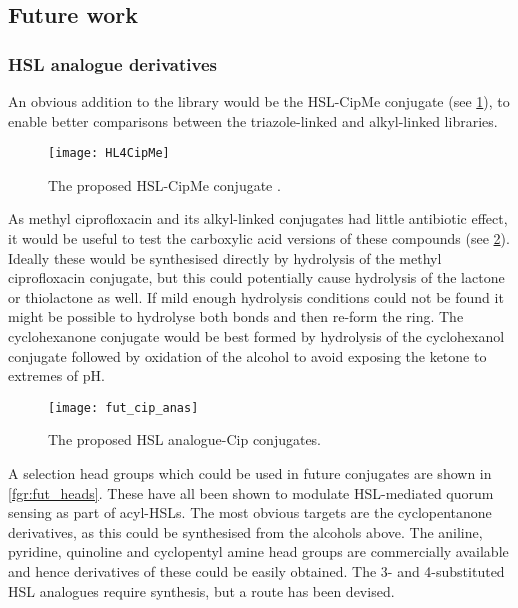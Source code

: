 \subsection{Future work \label{sec:Fut2}}

\subsubsection{HSL analogue derivatives}

An obvious addition to the library would be the HSL-CipMe conjugate (see \ref{fgr:HL4CipMe}), to enable better comparisons between the triazole-linked and alkyl-linked libraries.

\begin{figure}[H]
	\begin{center}
		\texttt{[image: HL4CipMe]}
		\caption{The proposed HSL-CipMe conjugate .
		\label{fgr:HL4CipMe}}
	\end{center}
\end{figure}

As methyl ciprofloxacin and its alkyl-linked conjugates had little antibiotic effect, it would be useful to test the carboxylic acid versions of these compounds (see \ref{fgr:fut_cip_anas}). Ideally these would be synthesised directly by hydrolysis of the methyl ciprofloxacin conjugate, but this could potentially cause hydrolysis of the lactone or thiolactone as well. If mild enough hydrolysis conditions could not be found it might be possible to hydrolyse both bonds and then re-form the ring\cite{Witiak1978}. The cyclohexanone conjugate would be best formed by hydrolysis of the cyclohexanol conjugate followed by oxidation of the alcohol to avoid exposing the ketone to extremes of pH.

\begin{figure}[H]
	\begin{center}
		\texttt{[image: fut\_cip\_anas]}
		\caption{The proposed HSL analogue-Cip conjugates.
		\label{fgr:fut_cip_anas}}
	\end{center}
\end{figure}

A selection head groups which could be used in future conjugates are shown in \ref{fgr:fut_heads}. These have all been shown to modulate HSL-mediated quorum sensing as part of acyl-HSLs\cite{Smith2003a,Welch2005,Ishida2007,Olsen2002,Smith2003,Hodgkinson2012a,Marsden2010}. The most obvious targets are the cyclopentanone derivatives, as this could be synthesised from the alcohols above. The aniline, pyridine, quinoline and cyclopentyl amine head groups are commercially available and hence derivatives of these could be easily obtained. The 3- and 4-substituted HSL analogues require synthesis, but a route has been devised\cite{Olsen2002}.


